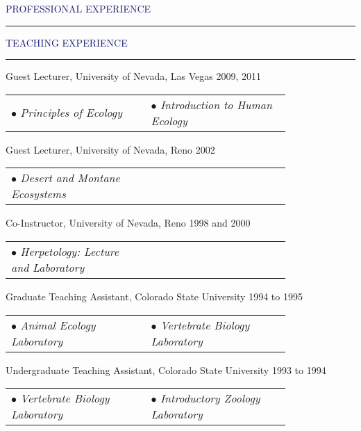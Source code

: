 \documentclass{resume} %
\renewenvironment{rSection}[1]{
\sectionskip
\textcolor{MidnightBlue}{\MakeUppercase{#1}}
\sectionlineskip
\hrule
\begin{list}{}{
\setlength{\leftmargin}{1.5em}
}
\item[]
}{
\end{list}
}
\begin{document}
\begin{rSection}{Professional Experience}
\begin{rSection}{Teaching Experience}
Guest Lecturer, University of Nevada, Las Vegas \hfill 2009, 2011
\begin{center}
\begin{tabular}{p{0.4\linewidth}p{0.4\linewidth}}
		$\bullet$  	\textit{Principles of Ecology} &
        $\bullet$  	\textit{Introduction to Human Ecology} \\
\end{tabular}
\end{center}

Guest Lecturer, University of Nevada, Reno \hfill 2002
\begin{center}
\begin{tabular}{p{0.4\linewidth}p{0.4\linewidth}}
     $\bullet$   \textit{Desert and Montane Ecosystems} & \\
\end{tabular}
\end{center}

Co-Instructor, University of Nevada, Reno \hfill 1998 and 2000
\begin{center}
\begin{tabular}{p{0.4\linewidth}p{0.4\linewidth}}
		$\bullet$ 	\textit{Herpetology: Lecture and Laboratory} &
\end{tabular}
\end{center}

Graduate Teaching Assistant, Colorado State University  \hfill 1994 to 1995
\begin{center}
\begin{tabular}{p{0.4\linewidth}p{0.4\linewidth}}
	     $\bullet$ 	\textit{Animal Ecology Laboratory} & 
         $\bullet$ 	\textit{Vertebrate Biology Laboratory} \\
\end{tabular}
\end{center}

Undergraduate Teaching Assistant, Colorado State University \hfill 1993 to 1994
\begin{center}
\begin{tabular}{p{0.4\linewidth}p{0.4\linewidth}}
	     $\bullet$ \textit{Vertebrate Biology Laboratory} & 
         $\bullet$ \textit{Introductory Zoology Laboratory} \\
\end{tabular}
\end{center}

\end{rSection}


\end{rSection}
\end{document}
